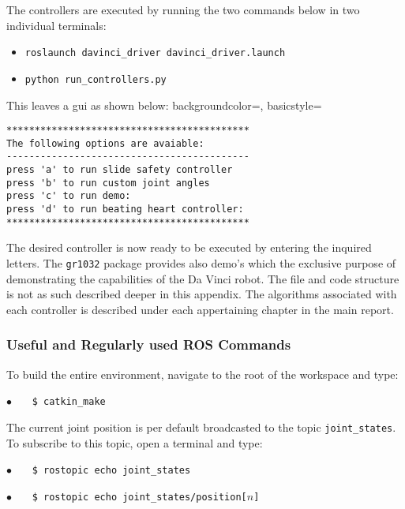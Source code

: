The controllers are executed by running the two commands below in two individual terminals:
\begin{itemize}
\item \texttt{roslaunch davinci\_driver davinci\_driver.launch}
\item \texttt{python run\_controllers.py}
\end{itemize}
This leaves a \gls{gui} as shown below:
{
    backgroundcolor=\color{white},
    basicstyle=\scriptsize\color{black}\ttfamily
}
\begin{lstlisting}[style=DOS]
*******************************************
The following options are avaiable:
-------------------------------------------
press 'a' to run slide safety controller
press 'b' to run custom joint angles
press 'c' to run demo:
press 'd' to run beating heart controller:
*******************************************
\end{lstlisting}
The desired controller is now ready to be executed by entering the inquired letters. The \texttt{gr1032} package provides also demo's which the exclusive purpose of demonstrating the capabilities of the Da Vinci robot. The file and code structure is not as such described deeper in this appendix. The algorithms associated with each controller is described under each appertaining chapter in the main report. 
\subsubsection*{Useful and Regularly used ROS Commands}
To build the entire environment, navigate to the root of the workspace and type:

\hspace{1cm} \textbf{$\bullet$} \ \ \  \texttt{\$ catkin\_make}%

The current joint position is per default broadcasted to the topic \texttt{joint\_states}. To subscribe to this topic, open a terminal and type:

\hspace{1cm} \textbf{$\bullet$} \ \ \  \texttt{\$ rostopic echo joint\_states} \ \ \ {} 

\hspace{1cm} \textbf{$\bullet$} \ \ \  \texttt{\$ rostopic echo joint\_states/position[$n$]} \ \ \  {} 

